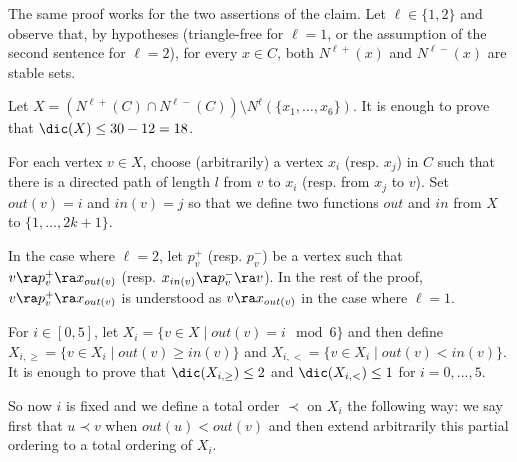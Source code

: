 \begin{subproof} 
The same proof works for the two assertions of the claim. Let $\ell \in \{1,2\}$ and observe that, by hypotheses (triangle-free for $\ell=1$, or the assumption of the second sentence for $\ell=2$), for every $x \in C$, both $N^{\ell +}(x)$ and $N^{\ell -}(x)$ are stable sets.


Let $X = (N^{\ell+}(C) \cap N^{\ell-}(C)) \setminus N^{\ell}(\{x_1, \dots, x_6\})$. It is enough to prove that $\dic(X) \leq 30-12= 18$. 



For each vertex $v  \in X$, choose (arbitrarily) a vertex $x_i$ (resp. $x_j$) in $C$ such that there is a directed path of length $l$ from $v$ to $x_i$ (resp. from $x_j$ to $v$). Set $out(v)=i$ and $in(v)=j$ so that we define two functions $out$ and $in$ from $X$ to $\{1,\ldots,2k+1\}$.

 In the case where $\ell = 2$, let  $p^{+}_{v}$ (resp. $p^{-}_{v}$) be a vertex such that $v \ra p^+_v \ra x_{out(v)}$ (resp. $x_{in(v)} \ra p^-_v \ra v$). In the rest of the proof, $v \ra p^+_v \ra x_{out(v)}$ is understood as $v \ra x_{out(v)}$ in the case where $\ell = 1$. 


 For $i \in [0,5]$, let  $X_{i} = \{v \in X \mid out(v) = i\mod 6 \}$ and then define $X_{i,\geq} = \{v \in X_{i} \mid out(v) \geq in(v)\}$ and $X_{i,<} = \{v \in X_{i} \mid out(v) < in(v)\}$. It is enough to prove that $\dic(X_{i,\geq}) \leq 2$ and $\dic(X_{i,<})\leq 1$ for $i=0, \dots, 5$. 

So now $i$ is fixed and we define a total order $\prec$ on $X_i$ the  following way: we say first that $u \prec v$ when $out(u) < out(v)$ and then extend arbitrarily this partial ordering to a total ordering of $X_i$. 


\end{subproof}

